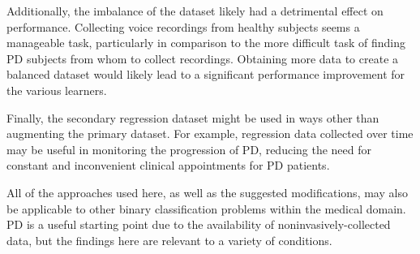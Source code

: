 \documentclass[draftcopy]{srpaper}
\begin{document}
Additionally, the imbalance of the dataset likely had a detrimental
effect on performance. Collecting voice recordings from healthy
subjects seems a manageable task, particularly in comparison to the
more difficult task of finding PD subjects from whom to collect
recordings. Obtaining more data to create a balanced dataset would
likely lead to a significant performance improvement for the various
learners. 

Finally, the secondary regression dataset might be used in ways other
than augmenting the primary dataset. For example, regression data
collected over time may be useful in monitoring the progression of PD,
reducing the need for constant and inconvenient clinical appointments
for PD patients. 

All of the approaches used here, as well as the suggested
modifications, may also be applicable to other binary classification
problems within the medical domain. PD is a useful starting point due
to the availability of noninvasively-collected data, but the findings
here are relevant to a variety of conditions.


\end{document}
